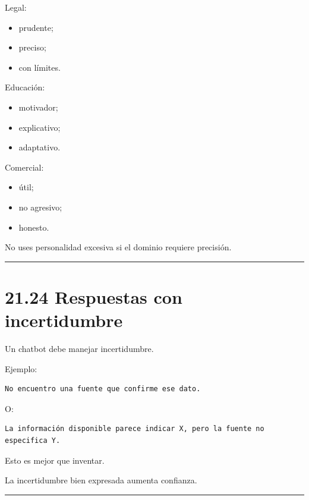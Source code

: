 Legal:

\begin{itemize}
\tightlist
\item
  prudente;
\item
  preciso;
\item
  con límites.
\end{itemize}

Educación:

\begin{itemize}
\tightlist
\item
  motivador;
\item
  explicativo;
\item
  adaptativo.
\end{itemize}

Comercial:

\begin{itemize}
\tightlist
\item
  útil;
\item
  no agresivo;
\item
  honesto.
\end{itemize}

No uses personalidad excesiva si el dominio requiere precisión.

\begin{center}\rule{0.5\linewidth}{0.5pt}\end{center}

\section{21.24 Respuestas con
incertidumbre}\label{respuestas-con-incertidumbre}

Un chatbot debe manejar incertidumbre.

Ejemplo:

\begin{lstlisting}
No encuentro una fuente que confirme ese dato.
\end{lstlisting}

O:

\begin{lstlisting}
La información disponible parece indicar X, pero la fuente no especifica Y.
\end{lstlisting}

Esto es mejor que inventar.

La incertidumbre bien expresada aumenta confianza.

\begin{center}\rule{0.5\linewidth}{0.5pt}\end{center}

